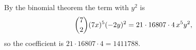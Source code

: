 By the binomial theorem the term with $y^2$ is
\[
\dbinom72(7x)^5(-2y)^2=21\cdot16807\cdot4\,x^5y^2 ,
\]
so the coefficient is $21\cdot16807\cdot4=\boxed{1411788}$.
